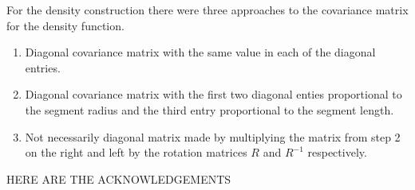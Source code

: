 \documentclass[11pt,a4paper]{article}
\numberwithin{equation}{section}
\theoremstyle{plain}
\theoremstyle{definition}
\theoremstyle{remark}
\begin{document}
For the density construction there were three approaches to the covariance matrix for the density function.

\begin{enumerate}
	\item Diagonal covariance matrix with the same value in each of the diagonal entries.
	\item Diagonal covariance matrix with the first two diagonal enties proportional to the segment radius and the third entry proportional to the segment length.
	\item Not necessarily diagonal matrix made by multiplying the matrix from step 2 on the right and left by the rotation matrices $R$ and $R^{-1}$ respectively.  
\end{enumerate}	


HERE ARE THE ACKNOWLEDGEMENTS
	

    
\end{document}
